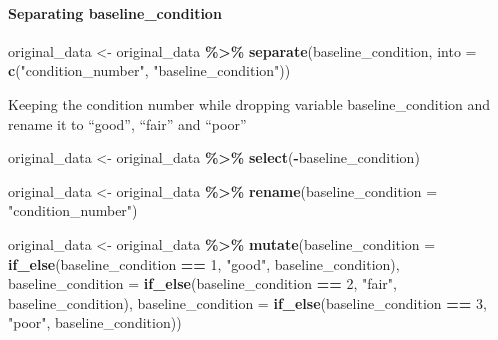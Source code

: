 \documentclass[
]{article}
\newenvironment{Shaded}{\begin{snugshade}}{\end{snugshade}}
\newcommand{\AttributeTok}[1]{\textcolor[rgb]{0.13,0.29,0.53}{#1}}
\newcommand{\DecValTok}[1]{\textcolor[rgb]{0.00,0.00,0.81}{#1}}
\newcommand{\FunctionTok}[1]{\textcolor[rgb]{0.13,0.29,0.53}{\textbf{#1}}}
\newcommand{\NormalTok}[1]{#1}
\newcommand{\OtherTok}[1]{\textcolor[rgb]{0.56,0.35,0.01}{#1}}
\newcommand{\SpecialCharTok}[1]{\textcolor[rgb]{0.81,0.36,0.00}{\textbf{#1}}}
\newcommand{\StringTok}[1]{\textcolor[rgb]{0.31,0.60,0.02}{#1}}
\begin{document}
\paragraph{Separating
baseline\_condition}\label{separating-baseline_condition}

\begin{Shaded}
\begin{Highlighting}[]
\NormalTok{original\_data }\OtherTok{\textless{}{-}}\NormalTok{ original\_data }\SpecialCharTok{\%\textgreater{}\%} 
  \FunctionTok{separate}\NormalTok{(baseline\_condition, }\AttributeTok{into =} \FunctionTok{c}\NormalTok{(}\StringTok{"condition\_number"}\NormalTok{, }\StringTok{"baseline\_condition"}\NormalTok{))}
\end{Highlighting}
\end{Shaded}

Keeping the condition number while dropping variable baseline\_condition
and rename it to ``good'', ``fair'' and ``poor''

\begin{Shaded}
\begin{Highlighting}[]
\NormalTok{original\_data }\OtherTok{\textless{}{-}}\NormalTok{ original\_data }\SpecialCharTok{\%\textgreater{}\%} \FunctionTok{select}\NormalTok{(}\SpecialCharTok{{-}}\NormalTok{baseline\_condition)}
\end{Highlighting}
\end{Shaded}

\begin{Shaded}
\begin{Highlighting}[]
\NormalTok{original\_data }\OtherTok{\textless{}{-}}\NormalTok{ original\_data }\SpecialCharTok{\%\textgreater{}\%} \FunctionTok{rename}\NormalTok{(}\AttributeTok{baseline\_condition =} \StringTok{"condition\_number"}\NormalTok{)}

\NormalTok{original\_data }\OtherTok{\textless{}{-}}\NormalTok{ original\_data }\SpecialCharTok{\%\textgreater{}\%} 
  \FunctionTok{mutate}\NormalTok{(}\AttributeTok{baseline\_condition =} \FunctionTok{if\_else}\NormalTok{(baseline\_condition }\SpecialCharTok{==} \DecValTok{1}\NormalTok{, }\StringTok{"good"}\NormalTok{, baseline\_condition),}
         \AttributeTok{baseline\_condition =} \FunctionTok{if\_else}\NormalTok{(baseline\_condition }\SpecialCharTok{==} \DecValTok{2}\NormalTok{, }\StringTok{"fair"}\NormalTok{, baseline\_condition),}
         \AttributeTok{baseline\_condition =} \FunctionTok{if\_else}\NormalTok{(baseline\_condition }\SpecialCharTok{==} \DecValTok{3}\NormalTok{, }\StringTok{"poor"}\NormalTok{, baseline\_condition))}
\end{Highlighting}
\end{Shaded}
\end{document}
